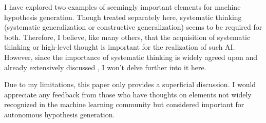 I have explored two examples of seemingly important elements for machine hypothesis generation. Though treated separately here, systematic thinking (systematic generalization or constructive generalization) seems to be required for both. Therefore, I believe, like many others, that the acquisition of systematic thinking or high-level thought is important for the realization of such AI. However, since the importance of systematic thinking is widely agreed upon and already extensively discussed \cite{goyal2022inductive}, I won't delve further into it here. 

Due to my limitations, this paper only provides a superficial discussion. I would appreciate any feedback from those who have thoughts on elements not widely recognized in the machine learning community but considered important for autonomous hypothesis generation.




